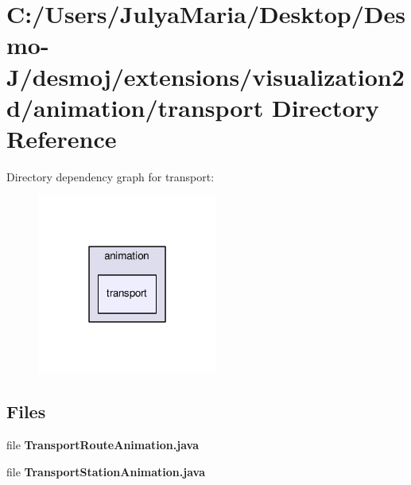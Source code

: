 \section{C\-:/\-Users/\-Julya\-Maria/\-Desktop/\-Desmo-\/\-J/desmoj/extensions/visualization2d/animation/transport Directory Reference}
\label{dir_9c295b488887f1a6c3f03f0ff5ccd490}
Directory dependency graph for transport\-:
\nopagebreak
\begin{figure}[H]
\begin{center}
\leavevmode
\includegraphics[width=168pt]{dir_9c295b488887f1a6c3f03f0ff5ccd490_dep}
\end{center}
\end{figure}
\subsection*{Files}
\begin{DoxyCompactItemize}
\item 
file {\bfseries Transport\-Route\-Animation.\-java}
\item 
file {\bfseries Transport\-Station\-Animation.\-java}
\end{DoxyCompactItemize}

